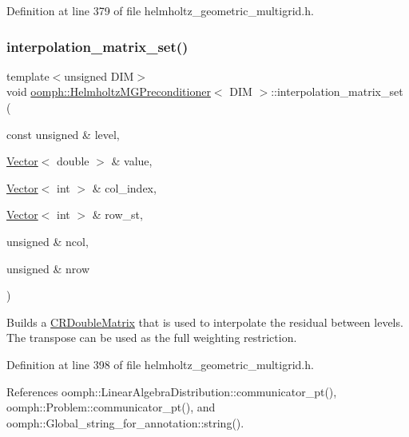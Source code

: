 Definition at line 379 of file helmholtz\+\_\+geometric\+\_\+multigrid.\+h.

\mbox{\label{classoomph_1_1HelmholtzMGPreconditioner_a45b4d0a9f16d23b8571ed9b09ca5764d}} 
\subsubsection{\texorpdfstring{interpolation\+\_\+matrix\+\_\+set()}{interpolation\_matrix\_set()}\hspace{0.1cm}{\footnotesize\ttfamily [2/2]}}
{\footnotesize\ttfamily template$<$unsigned D\+IM$>$ \\
void \hyperlink{classoomph_1_1HelmholtzMGPreconditioner}{oomph\+::\+Helmholtz\+M\+G\+Preconditioner}$<$ D\+IM $>$\+::interpolation\+\_\+matrix\+\_\+set (\begin{DoxyParamCaption}\item[{const unsigned \&}]{level,  }\item[{\hyperlink{classoomph_1_1Vector}{Vector}$<$ double $>$ \&}]{value,  }\item[{\hyperlink{classoomph_1_1Vector}{Vector}$<$ int $>$ \&}]{col\+\_\+index,  }\item[{\hyperlink{classoomph_1_1Vector}{Vector}$<$ int $>$ \&}]{row\+\_\+st,  }\item[{unsigned \&}]{ncol,  }\item[{unsigned \&}]{nrow }\end{DoxyParamCaption})\hspace{0.3cm}{\ttfamily [inline]}}



Builds a \hyperlink{classoomph_1_1CRDoubleMatrix}{C\+R\+Double\+Matrix} that is used to interpolate the residual between levels. The transpose can be used as the full weighting restriction. 



Definition at line 398 of file helmholtz\+\_\+geometric\+\_\+multigrid.\+h.



References oomph\+::\+Linear\+Algebra\+Distribution\+::communicator\+\_\+pt(), oomph\+::\+Problem\+::communicator\+\_\+pt(), and oomph\+::\+Global\+\_\+string\+\_\+for\+\_\+annotation\+::string().


